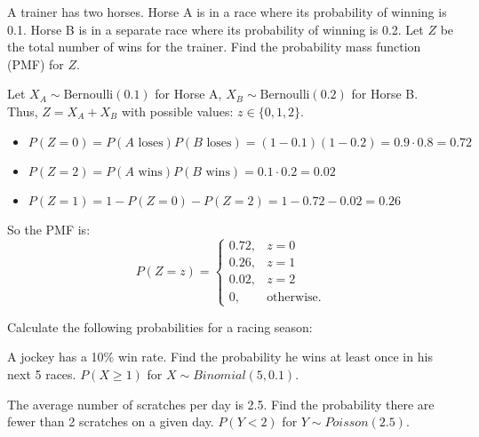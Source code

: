 \documentclass[a4paper, 10pt]{article}
\begin{document}
\begin{tosubmit}
\problem[12]
A trainer has two horses. Horse A is in a race where its probability of winning is 0.1.
Horse B is in a separate race where its probability of winning is 0.2.
Let \( Z \) be the total number of wins for the trainer.
Find the probability mass function (PMF) for \( Z \).

\vspace{0.5em}
\par\noindent\submitsolution
Let \( X_A\sim \text{Bernoulli}(0.1) \) for Horse A, \( X_B\sim \text{Bernoulli}(0.2) \) for Horse B. \\
Thus, \( Z=X_A+X_B \) with possible values: \( z\in\{0, 1, 2\} \).

\begin{itemize}
    \item \( P(Z=0)=P(A\text{ loses})P(B\text{ loses})=(1-0.1)(1-0.2)=0.9\cdot0.8=0.72 \)
    \item \( P(Z=2)=P(A\text{ wins})P(B\text{ wins})=0.1\cdot0.2=0.02 \)
    \item \( P(Z=1)=1-P(Z=0)-P(Z=2)=1-0.72-0.02=0.26 \)
\end{itemize}

So the PMF is:
\[\boxed{
    P(Z = z) =
    \begin{cases}
    0.72, & z=0\\
    0.26, & z=1\\
    0.02, & z=2\\
    0, & \text{otherwise.}
    \end{cases}
}\]
\end{tosubmit}


\begin{problem}
Calculate the following probabilities for a racing season:
\begin{subproblems}
    \item A jockey has a 10\% win rate. Find the probability he wins at least once in his next 5 races.
    \( P(X \geq 1) \) for \( X \sim Binomial(5, 0.1) \).
    \item The average number of scratches per day is 2.5. Find the probability there are fewer than 2 scratches on a given day.
    \( P(Y < 2) \) for \( Y \sim Poisson(2.5) \).
\end{subproblems}
\end{problem}
\end{document}
